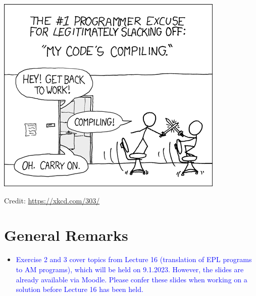\documentclass[a4paper]{article}
\begin{document}

\begin{onlysolution}
  \begin{center}
    \includegraphics[scale=0.5]{xkcd_303}

    \scriptsize Credit: \href{https://xkcd.com/303/}{https://xkcd.com/303/}
  \end{center}
\end{onlysolution}

\section*{General Remarks}
\begin{itemize}
  \item \textcolor{blue}{Exercise 2 and 3 cover topics from Lecture 16 (translation of EPL programs to AM programs), which will be held on 9.1.2023. However, the slides are already available via Moodle. Please confer these slides when working on a solution before Lecture 16 has been held.}
\end{itemize}




\pagebreak

\end{document}
